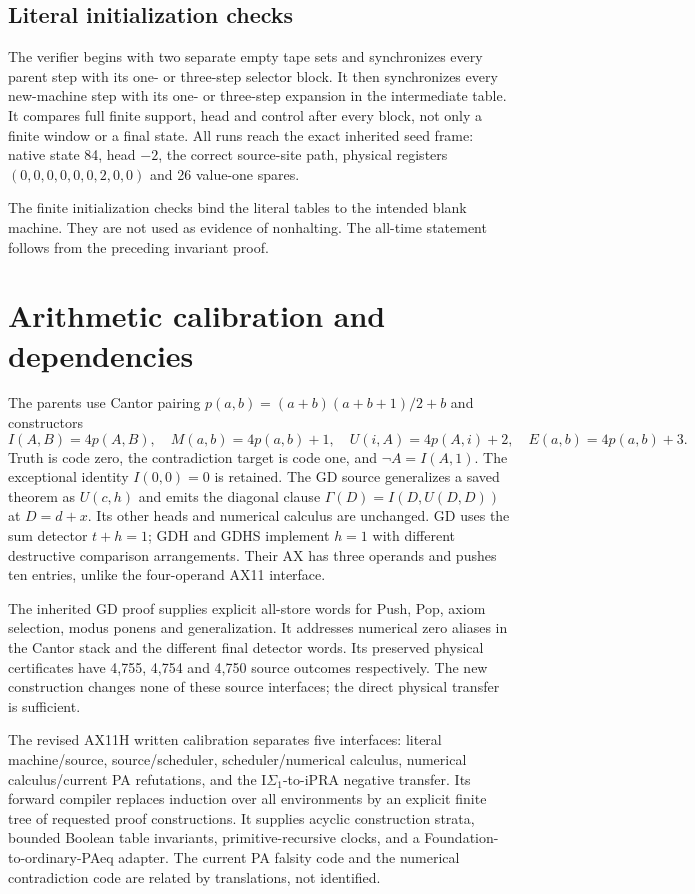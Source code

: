 \documentclass[11pt,letterpaper]{article}
\begin{document}
\subsection{Literal initialization checks}

The verifier begins with two separate empty tape sets and synchronizes
every parent step with its one- or three-step selector block. It then
synchronizes every new-machine step with its one- or three-step expansion
in the intermediate table. It compares full finite support, head and
control after every block, not only a finite window or a final state.
All runs reach the exact inherited seed frame: native state 84, head
$-2$, the correct source-site path, physical registers
$(0,0,0,0,0,0,2,0,0)$ and 26 value-one spares.



The finite initialization checks bind the literal tables to the intended
blank machine. They are not used as evidence of nonhalting. The all-time
statement follows from the preceding invariant proof.

\section{Arithmetic calibration and dependencies}
\label{sec:calibration}

The parents use Cantor pairing
$p(a,b)=(a+b)(a+b+1)/2+b$ and constructors
\[
 I(A,B)=4p(A,B),\quad M(a,b)=4p(a,b)+1,\quad
 U(i,A)=4p(A,i)+2,\quad E(a,b)=4p(a,b)+3.
\]
Truth is code zero, the contradiction target is code one, and
$\neg A=I(A,1)$. The exceptional identity $I(0,0)=0$ is retained.
The GD source generalizes a saved theorem as $U(c,h)$ and emits the
diagonal clause $\Gamma(D)=I(D,U(D,D))$ at $D=d+x$.
Its other heads and numerical calculus are unchanged. GD uses the
sum detector $t+h=1$; GDH and GDHS implement $h=1$ with different
destructive comparison arrangements. Their AX has three operands and
pushes ten entries, unlike the four-operand AX11 interface.\cite{gd}

The inherited GD proof supplies explicit all-store words for Push, Pop,
axiom selection, modus ponens and generalization. It addresses numerical
zero aliases in the Cantor stack and the different final detector words.
Its preserved physical certificates have 4,755, 4,754 and 4,750 source
outcomes respectively. The new construction changes none of these
source interfaces; the direct physical transfer is sufficient.

The revised AX11H written calibration separates five interfaces:
literal machine/source, source/scheduler, scheduler/numerical calculus,
numerical calculus/current PA refutations, and the I$\Sigma_1$-to-iPRA
negative transfer. Its forward compiler replaces induction over all
environments by an explicit finite tree of requested proof constructions.
It supplies acyclic construction strata, bounded Boolean table invariants,
primitive-recursive clocks, and a Foundation-to-ordinary-PAeq adapter.
The current PA falsity code and the numerical contradiction code are
related by translations, not identified.\cite{ax11h}
\end{document}
